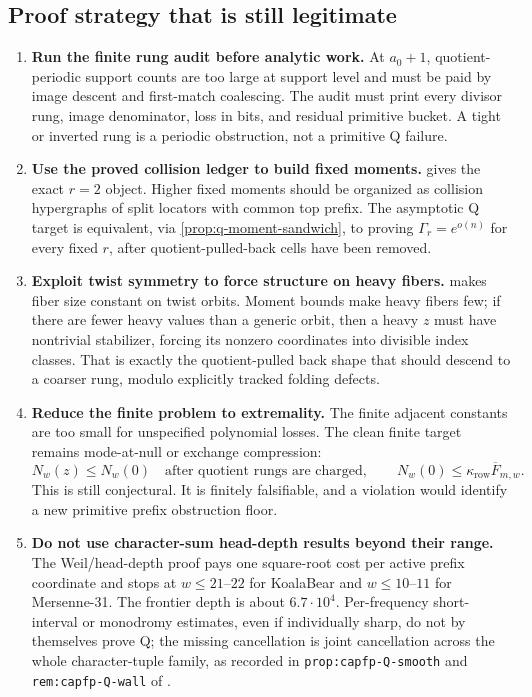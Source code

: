 \subsection{Proof strategy that is still legitimate}

\begin{enumerate}[label=\textup{Q\arabic*.},leftmargin=3.0em]
\item \textbf{Run the finite rung audit before analytic work.}
At \(a_0+1\), quotient-periodic support counts are too large at support level
and must be paid by image descent and first-match coalescing.  The audit must
print every divisor rung, image denominator, loss in bits, and residual
primitive bucket.  A tight or inverted rung is a periodic obstruction, not a
primitive Q failure.

\item \textbf{Use the proved collision ledger to build fixed moments.}
 gives the exact \(r=2\) object.  Higher fixed
moments should be organized as collision hypergraphs of split locators with
common top prefix.  The asymptotic Q target is equivalent, via
\cref{prop:q-moment-sandwich}, to proving \(\Gamma_r=e^{o(n)}\) for every
fixed \(r\), after quotient-pulled-back cells have been removed.

\item \textbf{Exploit twist symmetry to force structure on heavy fibers.}
 makes fiber size constant on twist orbits.  Moment bounds
make heavy fibers few; if there are fewer heavy values than a generic orbit,
then a heavy \(z\) must have nontrivial stabilizer, forcing its nonzero
coordinates into divisible index classes.  That is exactly the quotient-pulled
back shape that should descend to a coarser rung, modulo explicitly tracked
folding defects.

\item \textbf{Reduce the finite problem to extremality.}
The finite adjacent constants are too small for unspecified polynomial losses.
The clean finite target remains mode-at-null or exchange compression:
\[
        N_w(z)\le N_w(0)\quad\text{after quotient rungs are charged},
        \qquad
        N_w(0)\le \kappa_{\mathrm{row}}\overline F_{m,w}.
\]
This is still conjectural.  It is finitely falsifiable, and a violation would
identify a new primitive prefix obstruction floor.

\item \textbf{Do not use character-sum head-depth results beyond their range.}
The Weil/head-depth proof pays one square-root cost per active prefix coordinate
and stops at \(w\le21\)--\(22\) for KoalaBear and \(w\le10\)--\(11\) for
Mersenne-31.  The frontier depth is about \(6.7\cdot10^4\).  Per-frequency
short-interval or monodromy estimates, even if individually sharp, do not by
themselves prove Q; the missing cancellation is joint cancellation across the
whole character-tuple family, as recorded in
\texttt{prop:capfp-Q-smooth} and \texttt{rem:capfp-Q-wall} of
\cite{CAP25v13}.
\end{enumerate}

